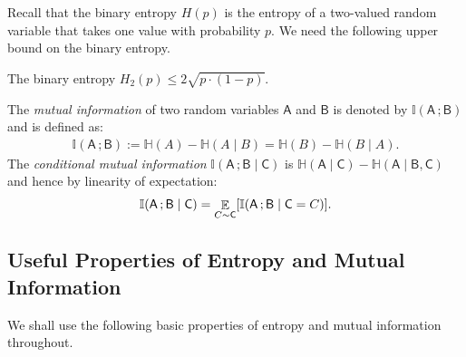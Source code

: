 \documentclass[11pt,letterpaper]{article}
\DeclareMathOperator*{\E}{\mathbb{E}}
\renewcommand{\leq}{\leqslant}
\theoremstyle{definition}
\newcommand{\bracket}[1]{\mleft[#1\mright]}
\newcommand{\rA}{\rv{A}}
\newcommand{\rB}{\rv{B}}
\newcommand{\rC}{\rv{C}}
\newcommand{\rv}[1]{\ensuremath{\mathsf{#1}}}
\newcommand{\II}{\ensuremath{\mathbb{I}}}
\newcommand{\HH}{\ensuremath{\mathbb{H}}}
\newcommand{\mi}[2]{\ensuremath{\II(#1 \,; #2)}}
\newcommand{\en}[1]{\ensuremath{\HH(#1)}}
\begin{document}
\noindent
Recall that the binary entropy $H(p)$ is the entropy of a two-valued random
variable that takes one value with probability $p$.
We need the following upper bound on the binary entropy.

\begin{fact}\label{fact:ent-ub}
  The binary entropy $H_2(p) \leq 2 \sqrt{ p \cdot (1 - p) }$.
\end{fact}


 
The \emph{mutual information} of two random variables $\rA$ and $\rB$ is denoted by
$\mi{\rA}{\rB}$ and is defined as:
\begin{align}
\mi{\rA}{\rB} := \en{A} - \en{A \mid  B} = \en{B} - \en{B \mid  A}. \label{eq:mi}
\end{align}
\noindent
The \emph{conditional mutual information} $\mi{\rA}{\rB \mid \rC}$ is $\en{\rA \mid \rC} - \en{\rA \mid \rB,\rC}$ and hence by linearity of expectation:
\begin{align}
	\mi{\rA}{\rB \mid \rC} = \E_{C \sim \rC} \bracket{\mi{\rA}{\rB \mid \rC = C}}. \label{eq:cond-mi}
\end{align} 



\subsection{Useful Properties of Entropy and Mutual Information}\label{sec:prop-en-mi}

We shall use the following basic properties of entropy and mutual information throughout. 
\end{document}
